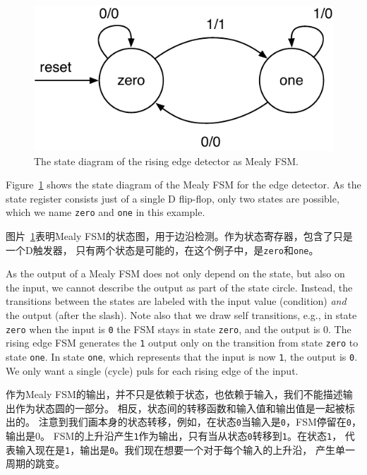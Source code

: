 \documentclass[%
    10pt,
    headinclude, footexclude,
    openright, %
    notitlepage,
    cleardoubleempty,
    headsepline,
    pointlessnumbers,
    bibtotoc, idxtotoc,
    ]{scrbook}
\newcommand{\code}[1]{{\small{\texttt{#1}}}}
\newcommand{\scale}{0.7}
\begin{document}
\begin{figure}
  \centering
  \includegraphics[scale=\scale]{figures/state-diag-mealy}
  \caption{The state diagram of the rising edge detector as Mealy FSM.}
  \label{fig:diag:mealy}
\end{figure}

Figure~\ref{fig:diag:mealy} shows the state diagram of the Mealy FSM for the
edge detector. As the state register consists just of a single D flip-flop,
only two states are possible, which we name \code{zero} and \code{one} in this
example.

图片~\ref{fig:diag:mealy}表明Mealy FSM的状态图，用于边沿检测。作为状态寄存器，包含了只是一个D触发器，
只有两个状态是可能的，在这个例子中，是\code{zero}和\code{one}。

As the output of a Mealy FSM does not only depend on the state, but also
on the input, we cannot describe the output as part of the state circle.
Instead, the transitions between the states are labeled with the input
value (condition) \emph{and} the output (after the slash).
Note also that we draw self transitions, e.g., in state \code{zero} when
the input is \code{0} the FSM stays in state \code{zero}, and the output is {0}.
The rising edge FSM generates the \code{1} output only on the transition
from state \code{zero} to state \code{one}. In state \code{one}, which represents
that the input is now \code{1}, the output is \code{0}. We only want a single (cycle)
puls for each rising edge of the input.

作为Mealy FSM的输出，并不只是依赖于状态，也依赖于输入，我们不能描述输出作为状态圆的一部分。
相反，状态间的转移函数和输入值和输出值是一起被标出的。
注意到我们画本身的状态转移，例如，在状态\code{0}当输入是\code{0}，FSM停留在\code{0}，
输出是{0}。
FSM的上升沿产生\code{1}作为输出，只有当从状态\code{0}转移到\code{1}。在状态\code{1}，
代表输入现在是\code{1}，输出是\code{0}。我们现在想要一个对于每个输入的上升沿，
产生单一周期的跳变。
\end{document}
